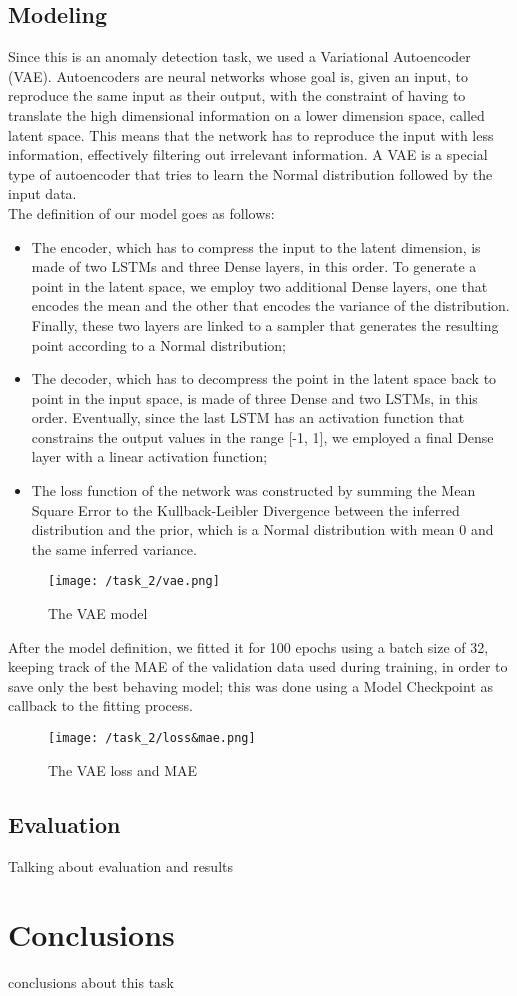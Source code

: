 \documentclass[12pt,a4paper,leqno]{article}
\begin{document}
	\subsection{Modeling}
	Since this is an anomaly detection task, we used a Variational Autoencoder (VAE). Autoencoders are neural networks whose goal is, given an input, to reproduce the same input as their output, with the constraint of having to translate the high dimensional information on a lower dimension space, called latent space. This means that the network has to reproduce the input with less information, effectively filtering out irrelevant information. A VAE is a special type of autoencoder that tries to learn the Normal distribution followed by the input data.\\
	The definition of our model goes as follows:
	\begin{itemize}
		\item The encoder, which has to compress the input to the latent dimension, is made of two LSTMs and three Dense layers, in this order. To generate a point in the latent space, we employ two additional Dense layers, one that encodes the mean and the other that encodes the variance of the distribution. Finally, these two layers are linked to a sampler that generates the resulting point according to a Normal distribution;
		\item The decoder, which has to decompress the point in the latent space back to point in the input space, is made of three Dense and two LSTMs, in this order. Eventually, since the last LSTM has an activation function that constrains the output values in the range [-1, 1], we employed a final Dense layer with a linear activation function;
		\item The loss function of the network was constructed by summing the Mean Square Error to the Kullback-Leibler Divergence between the inferred distribution and the prior, which is a Normal distribution with mean 0 and the same inferred variance.
	\end{itemize}
	\begin{figure}
		\centering
		\texttt{[image: /task\_2/vae.png]}
		\caption{The VAE model}
		\label{task_2/vae}
	\end{figure}
	After the model definition, we fitted it for 100 epochs using a batch size of 32, keeping track of the MAE of the validation data used during training, in order to save only the best behaving model; this was done using a Model Checkpoint as callback to the fitting process.
	\begin{figure}
		\centering
		\texttt{[image: /task\_2/loss\&mae.png]}
		\caption{The VAE loss and MAE}
		\label{task_2/loss&mae}
	\end{figure}
	
	\subsection{Evaluation}
	Talking about evaluation and results
	
	\newpage
	
	\section{Conclusions}
	conclusions about this task
	
\end{document}
